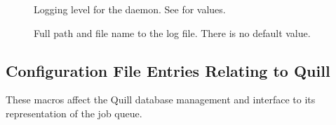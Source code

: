 \begin{description}
\item[]
  \label{param:ReplicationDebug}
  Logging level for the  daemon.
  See  for values.


\item[]
  \label{param:ReplicationLog}
  Full path and file name to the log file.
  There is no default value.

\end{description}


\subsection{\label{sec:Quill-Config-File-Entries}Configuration File
Entries Relating to Quill}

These macros affect the Quill database
management and interface to its representation of the job queue.


